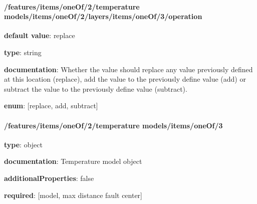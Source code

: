 \begin{itemized}
\end{itemized}\paragraph{/features/items/oneOf/2/temperature models/items/oneOf/2/layers/items/oneOf/3/operation} \begin{itemized}
\item {\bf default value}: replace
\item {\bf type}: string
\item {\bf documentation}: Whether the value should replace any value previously defined at this location (replace), add the value to the previously define value (add) or subtract the value to the previously define value (subtract).
\item {\bf enum}: [replace, add, subtract]\end{itemized}\paragraph{/features/items/oneOf/2/temperature models/items/oneOf/3} \begin{itemized}
\item {\bf type}: object
\item {\bf documentation}: Temperature model object
\item {\bf additionalProperties}: false
\item {\bf required}: [model, max distance fault center]\end{itemized}
